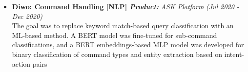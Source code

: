 \documentclass[a4paper,10pt]{article}
\newcommand{\isep}{-2 pt}
\begin{document}
\begin{itemize}

\item \textbf{Diwo: Command Handling  [NLP] \qquad \emph{Product:}} \emph{ASK Platform}  \hfill {\emph{(Jul 2020 - Dec 2020)}}\\
The goal was to replace keyword match-based query classification with an ML-based method. A BERT model was fine-tuned for sub-command classifications, and a BERT embeddings-based MLP model was developed for binary classification of command types and entity extraction based on intent-action pairs
\\ [-0.5cm]



\end{itemize}
\end{document}
